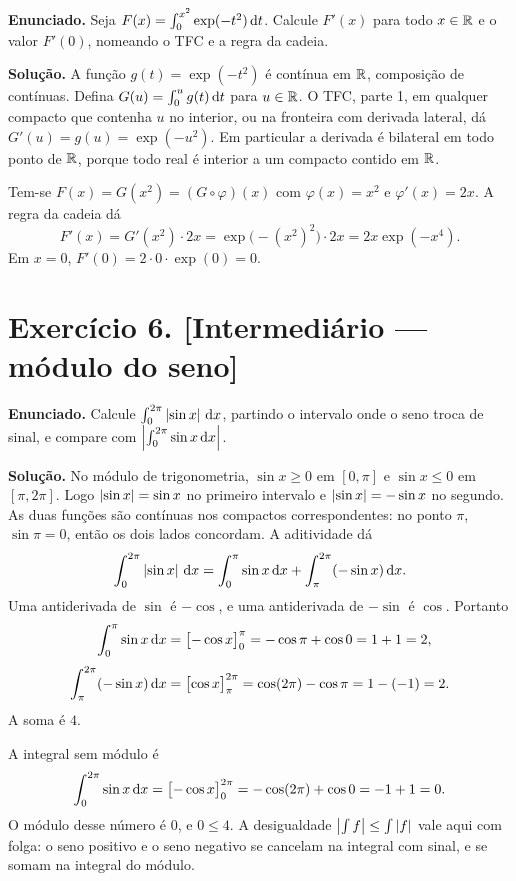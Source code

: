 \documentclass[11pt,a4paper]{article}
\begin{document}
\textbf{Enunciado.} Seja $F(x)=\int_0^{x^2}\exp(-t^2)\,\mathrm{d} t$. Calcule $F'(x)$ para todo $x\in\mathbb{R}$ e o valor $F'(0)$, nomeando o TFC e a regra da cadeia.

\textbf{Solução.}
A função $g(t)=\exp(-t^2)$ é contínua em $\mathbb{R}$, composição de contínuas. Defina $G(u)=\int_0^u g(t)\,\mathrm{d} t$ para $u\in\mathbb{R}$. O TFC, parte 1, em qualquer compacto que contenha $u$ no interior, ou na fronteira com derivada lateral, dá $G'(u)=g(u)=\exp(-u^2)$. Em particular a derivada é bilateral em todo ponto de $\mathbb{R}$, porque todo real é interior a um compacto contido em $\mathbb{R}$.

Tem-se $F(x)=G(x^2)=(G\circ\varphi)(x)$ com $\varphi(x)=x^2$ e $\varphi'(x)=2x$. A regra da cadeia dá
\[
F'(x)=G'(x^2)\cdot 2x=\exp\bigl(-(x^2)^2\bigr)\cdot 2x=2x\exp(-x^4).
\]
Em $x=0$, $F'(0)=2\cdot 0\cdot\exp(0)=0$.

\section*{Exercício 6. [Intermediário --- módulo do seno]}

\textbf{Enunciado.} Calcule $\int_0^{2\pi}\left\lvert \sin x \right\rvert\,\mathrm{d} x$, partindo o intervalo onde o seno troca de sinal, e compare com $\left\lvert \int_0^{2\pi}\sin x\,\mathrm{d} x \right\rvert$.

\textbf{Solução.}
No módulo de trigonometria, $\sin x\ge 0$ em $[0,\pi]$ e $\sin x\le 0$ em $[\pi,2\pi]$. Logo $\left\lvert \sin x \right\rvert=\sin x$ no primeiro intervalo e $\left\lvert \sin x \right\rvert=-\sin x$ no segundo. As duas funções são contínuas nos compactos correspondentes: no ponto $\pi$, $\sin\pi=0$, então os dois lados concordam. A aditividade dá
\[
\int_0^{2\pi}\left\lvert \sin x \right\rvert\,\mathrm{d} x
=\int_0^{\pi}\sin x\,\mathrm{d} x+\int_{\pi}^{2\pi}(-\sin x)\,\mathrm{d} x.
\]
Uma antiderivada de $\sin$ é $-\cos$, e uma antiderivada de $-\sin$ é $\cos$. Portanto
\begin{align*}
\int_0^{\pi}\sin x\,\mathrm{d} x
&=\bigl[-\cos x\bigr]_0^{\pi}
=-\cos\pi+\cos 0
=1+1=2,\\[0.3em]
\int_{\pi}^{2\pi}(-\sin x)\,\mathrm{d} x
&=\bigl[\cos x\bigr]_{\pi}^{2\pi}
=\cos(2\pi)-\cos\pi
=1-(-1)=2.
\end{align*}
A soma é $4$.

A integral sem módulo é
\[
\int_0^{2\pi}\sin x\,\mathrm{d} x
=\bigl[-\cos x\bigr]_0^{2\pi}
=-\cos(2\pi)+\cos 0
=-1+1=0.
\]
O módulo desse número é $0$, e $0\le 4$. A desigualdade $\left\lvert \int f \right\rvert\le\int\left\lvert f \right\rvert$ vale aqui com folga: o seno positivo e o seno negativo se cancelam na integral com sinal, e se somam na integral do módulo.
\end{document}
